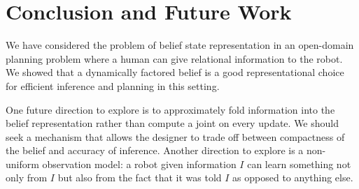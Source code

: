 \section{Conclusion and Future Work}
We have considered the problem of belief state representation in an
open-domain planning problem where a human can give relational
information to the robot. We showed that a dynamically factored belief
is a good representational choice for efficient inference and planning
in this setting.

One future direction to explore is to approximately fold information
into the belief representation rather than compute a joint on every
update. We should seek a mechanism that allows the designer to trade
off between compactness of the belief and accuracy of
inference. Another direction to explore is a non-uniform observation
model: a robot given information $I$ can learn something not only from
$I$ but also from the fact that it was told $I$ as opposed to anything
else.
